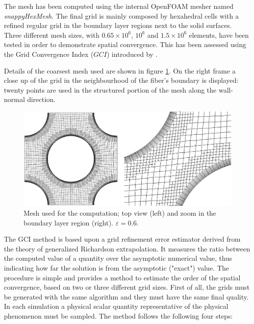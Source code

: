 The mesh has been computed using  the internal OpenFOAM mesher named \textit{snappyHexMesh}.
The final grid is mainly composed by hexahedral cells with a refined regular grid in the boundary layer regions next to the solid surfaces.
Three different mesh sizes, with $0.65 \times 10^6$, $10^6$ and $1.5 \times 10^6$ elements, have been tested in order to demonstrate spatial convergence. This has been assessed using the Grid Convergence Index ($GCI$) introduced by \citet{roache}.



Details of the coarsest mesh used are shown in figure \ref{fig:mesh1}. On the  right frame a close up of the grid in the neighbourhood of the fiber's boundary is displayed: twenty points are used in the structured portion of the mesh along the wall-normal direction.



\begin{figure}[h]
	\centering
	\includegraphics[width=0.8\linewidth]{chapter_4/figure/mesh}
	\caption{Mesh used for the computation; top view (left) and zoom in the boundary layer region (right). $\varepsilon = 0.6$.}
	\label{fig:mesh1}
\end{figure}




The GCI method is based upon a grid refinement error estimator derived from the
theory of generalized Richardson extrapolation. It measures the ratio between the computed value of a quantity over the asymptotic numerical value, thus indicating how far the solution is from the asymptotic ("exact") value.
The procedure is simple and provides a method to estimate the order of the spatial
convergence, based on two or three different grid sizes.
First of all, the grids must be generated with the same algorithm and they must  have the same final quality.
In each simulation   a physical scalar quantity representative of the physical phenomenon must be sampled.
The method follows the following four steps:

